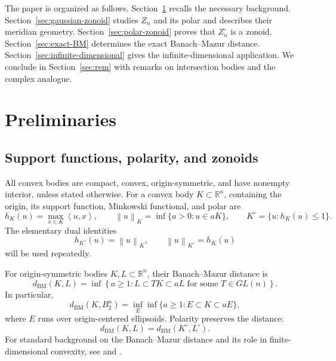 \documentclass[11pt]{article}
\theoremstyle{definition}
\theoremstyle{remark}
\newcommand{\R}{\mathbb R}
\newcommand{\norm}[1]{\left\|#1\right\|}
\newcommand{\ip}[2]{\left\langle #1,#2\right\rangle}
\newcommand{\BM}{\mathrm{BM}}
\begin{document}
The paper is organized as follows.
Section~\ref{sec:preliminaries} recalls the necessary background.
Section~\ref{sec:gaussian-zonoid} studies $Z_n$ and its polar and
describes their meridian geometry.
Section~\ref{sec:polar-zonoid} proves that $Z_n^\circ$ is a zonoid.
Section~\ref{sec:exact-BM} determines the exact Banach--Mazur distance.
 Section~\ref{sec:infinite-dimensional} gives the
infinite-dimensional application. We conclude in  Section~\ref{sec:rem} with remarks on intersection bodies and the complex
analogue.


\section{Preliminaries}\label{sec:preliminaries}

\subsection{Support functions, polarity, and zonoids}\label{subsec:zonoids-L1}

All convex bodies are compact, convex, origin-symmetric, and have
nonempty interior, unless stated otherwise.  For a convex body
$K\subset\R^n$, containing the origin,  its support function, Minkowski functional, and polar
are
\[
 h_K(u)=\max_{x\in K}\ip{u}{x},
 \qquad
 \norm{u}_K=\inf\{a>0:u\in aK\},
 \qquad
 K^\circ=\{u:h_K(u)\leq1\}.
\]
The elementary dual identities
\begin{equation}\label{eq:polar-identities}
 h_{K^\circ}(u)=\norm{u}_K,
 \qquad
 \norm{u}_{K^\circ}=h_K(u)
\end{equation}
will be used repeatedly.

For origin-symmetric bodies $K,L\subset\R^n$, their
Banach--Mazur distance is
\begin{equation}\label{eq:BM-definition}
 d_{\BM}(K,L)=\inf\left\{a\geq1:
 L\subset TK\subset aL\text{ for some }T\in GL(n)\right\}.
\end{equation}
In particular,
\begin{equation}\label{eq:BM-ellipsoids}
 d_{\BM}(K,B_2^n)
 =\inf_E\inf\{a\geq1:E\subset K\subset aE\},
\end{equation}
where $E$ runs over origin-centered ellipsoids.  Polarity preserves
the distance:
\begin{equation}\label{eq:BM-polar}
 d_{\BM}(K,L)=d_{\BM}(K^\circ,L^\circ).
\end{equation}
For standard background on the Banach--Mazur distance and its role in
finite-dimensional convexity, see
\cite[Definition~2.1.2, p.~49]{ArtsteinAvidanGiannopoulosMilman2015}
and \cite{TomczakJaegermann1989}.
\end{document}
